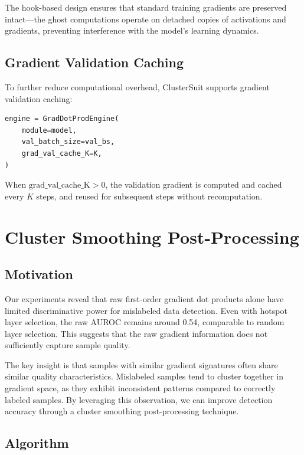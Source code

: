 \documentclass[12pt,a4paper]{report}
\begin{document}
The hook-based design ensures that standard training gradients are preserved intact---the ghost computations operate on detached copies of activations and gradients, preventing interference with the model's learning dynamics.

\subsection{Gradient Validation Caching}
\label{sec:gradient_cache}

To further reduce computational overhead, ClusterSuit supports gradient validation caching:

\begin{lstlisting}[language=Python]
engine = GradDotProdEngine(
    module=model,
    val_batch_size=val_bs,
    grad_val_cache_K=K,
)
\end{lstlisting}

When $\text{grad\_val\_cache\_K} > 0$, the validation gradient is computed and cached every $K$ steps, and reused for subsequent steps without recomputation.

\section{Cluster Smoothing Post-Processing}
\label{sec:cluster_smoothing}

\subsection{Motivation}
\label{sec:cs_motivation}

Our experiments reveal that raw first-order gradient dot products alone have limited discriminative power for mislabeled data detection. Even with hotspot layer selection, the raw AUROC remains around 0.54, comparable to random layer selection. This suggests that the raw gradient information does not sufficiently capture sample quality.

The key insight is that samples with similar gradient signatures often share similar quality characteristics. Mislabeled samples tend to cluster together in gradient space, as they exhibit inconsistent patterns compared to correctly labeled samples. By leveraging this observation, we can improve detection accuracy through a cluster smoothing post-processing technique.

\subsection{Algorithm}
\label{sec:cs_algorithm}
\end{document}
